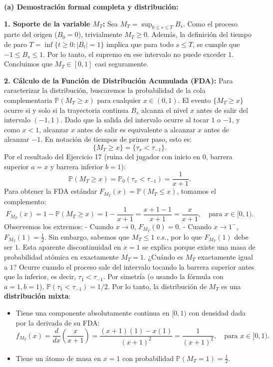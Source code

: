 \documentclass[11pt, letterpaper]{article}
\begin{document}
\begin{solucion}
    \vspace{3mm}
    \textbf{(a) Demostración formal completa y distribución:}

    \textbf{1. Soporte de la variable $M_T$:}
    Sea $M_T = \sup_{0 \le s \le T} B_s$. Como el proceso parte del origen ($B_0 = 0$), trivialmente $M_T \ge 0$. 
    Además, la definición del tiempo de paro $T = \inf\{t \ge 0 : |B_t| = 1\}$ implica que para todo $s \le T$, se cumple que $-1 \le B_s \le 1$. Por lo tanto, el supremo en ese intervalo no puede exceder $1$. 
    Concluimos que $M_T \in [0, 1]$ casi seguramente.

    \textbf{2. Cálculo de la Función de Distribución Acumulada (FDA):}
    Para caracterizar la distribución, buscaremos la probabilidad de la cola complementaria $\mathbb{P}(M_T \ge x)$ para cualquier $x \in (0, 1)$.
    El evento $\{M_T \ge x\}$ ocurre si y solo si la trayectoria continua $B_s$ alcanza el nivel $x$ antes de salir del intervalo $(-1, 1)$. Dado que la salida del intervalo ocurre al tocar $1$ o $-1$, y como $x < 1$, alcanzar $x$ antes de salir es equivalente a alcanzar $x$ antes de alcanzar $-1$.
    En notación de tiempos de primer paso, esto es:
    \[ \{M_T \ge x\} = \{\tau_x < \tau_{-1}\}. \]
    Por el resultado del Ejercicio 17 (ruina del jugador con inicio en $0$, barrera superior $a=x$ y barrera inferior $b=1$):
    \[ \mathbb{P}(M_T \ge x) = \mathbb{P}_0(\tau_x < \tau_{-1}) = \frac{1}{x + 1}. \]
    Para obtener la FDA estándar $F_{M_T}(x) = \mathbb{P}(M_T \le x)$, tomamos el complemento:
    \[ F_{M_T}(x) = 1 - \mathbb{P}(M_T \ge x) = 1 - \frac{1}{x+1} = \frac{x+1-1}{x+1} = \frac{x}{x+1}, \quad \text{para } x \in [0, 1). \]
    Observemos los extremos:
    - Cuando $x \to 0$, $F_{M_T}(0) = 0$.
    - Cuando $x \to 1^-$, $F_{M_T}(1) = \frac{1}{2}$.
    Sin embargo, sabemos que $M_T \le 1$ c.s., por lo que $F_{M_T}(1)$ debe ser $1$. 
    Esta aparente discontinuidad en $x=1$ se explica porque existe una masa de probabilidad atómica en exactamente $M_T = 1$. 
    ¿Cuándo es $M_T$ exactamente igual a $1$? Ocurre cuando el proceso sale del intervalo tocando la barrera superior antes que la inferior, es decir, $\tau_1 < \tau_{-1}$.
    Por simetría (o usando la fórmula con $a=1, b=1$), $\mathbb{P}(\tau_1 < \tau_{-1}) = 1/2$.
    Por lo tanto, la distribución de $M_T$ es una \textbf{distribución mixta}:
    \begin{itemize}
        \item Tiene una componente absolutamente continua en $[0, 1)$ con densidad dada por la derivada de su FDA:
        \[ f_{M_T}(x) = \frac{d}{dx}\left(\frac{x}{x+1}\right) = \frac{(x+1)(1) - x(1)}{(x+1)^2} = \frac{1}{(x+1)^2}, \quad \text{para } x \in [0, 1). \]
        \item Tiene un átomo de masa en $x=1$ con probabilidad $\mathbb{P}(M_T = 1) = \frac{1}{2}$.
    \end{itemize}


\end{solucion}
\end{document}
